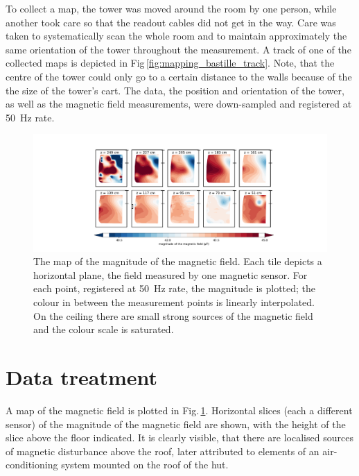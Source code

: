 To collect a map, the tower was moved around the room by one person, while another took care so that the readout cables did not get in the way.
Care was taken to systematically scan the whole room and to maintain approximately the same orientation of the tower throughout the measurement. A track of one of the collected maps is depicted in Fig\,\ref{fig:mapping_bastille_track}. Note, that the centre of the tower could only go to a certain distance to the walls because of the the size of the tower's cart.
The data, the position and orientation of the tower, as well as the magnetic field measurements, were down-sampled and registered at \SI{50}{\hertz} rate.

\begin{figure}
  \centering
  \includegraphics[width=\linewidth]{gfx/mapping/lpsc/bastille_crane_away_rep_magnitude_low_range_crop.pdf}
  \caption{The map of the magnitude of the magnetic field. Each tile depicts a horizontal plane, the field measured by one magnetic sensor. For each point, registered at \SI{50}{\hertz} rate, the magnitude is plotted; the colour in between the measurement points is linearly interpolated. On the ceiling there are small strong sources of the magnetic field and the colour scale is saturated.}\label{fig:mapping_bastille_magnitude}
\end{figure}



\section{Data treatment}
\label{sec:mapping_lpsc_data_treatment}
A map of the magnetic field is plotted in Fig.\,\ref{fig:mapping_bastille_magnitude}. Horizontal slices (each a different sensor) of the magnitude of the magnetic field are shown, with the height of the slice above the floor indicated. It is clearly visible, that there are localised sources of magnetic disturbance above the roof, later attributed to elements of an air-conditioning system mounted on the roof of the hut.

